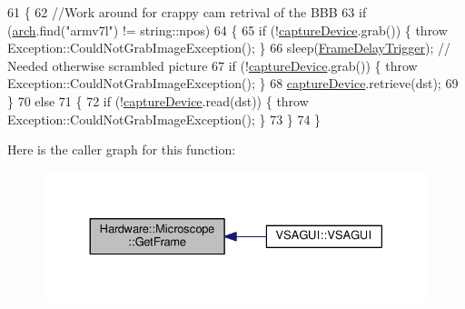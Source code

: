 \begin{DoxyCode}
61     \{
62         \textcolor{comment}{//Work around for crappy cam retrival of the BBB}
63         \textcolor{keywordflow}{if} (\hyperlink{class_hardware_1_1_microscope_a2e74ed11f3426a1a6adf05ec2d842066}{arch}.find(\textcolor{stringliteral}{"armv7l"}) != string::npos)
64         \{
65             \textcolor{keywordflow}{if} (!\hyperlink{class_hardware_1_1_microscope_a8fd921d7c937e808c5bc44c0294aa490}{captureDevice}.grab()) \{ \textcolor{keywordflow}{throw} Exception::CouldNotGrabImageException(); \}
66             sleep(\hyperlink{class_hardware_1_1_microscope_ac2da14781a22924a389fc287df3dbfda}{FrameDelayTrigger}); \textcolor{comment}{// Needed otherwise scrambled picture}
67             \textcolor{keywordflow}{if} (!\hyperlink{class_hardware_1_1_microscope_a8fd921d7c937e808c5bc44c0294aa490}{captureDevice}.grab()) \{ \textcolor{keywordflow}{throw} Exception::CouldNotGrabImageException(); \}
68             \hyperlink{class_hardware_1_1_microscope_a8fd921d7c937e808c5bc44c0294aa490}{captureDevice}.retrieve(dst);
69         \}
70         \textcolor{keywordflow}{else}
71         \{
72             \textcolor{keywordflow}{if} (!\hyperlink{class_hardware_1_1_microscope_a8fd921d7c937e808c5bc44c0294aa490}{captureDevice}.read(dst)) \{ \textcolor{keywordflow}{throw} Exception::CouldNotGrabImageException(); \}
73         \}
74     \}
\end{DoxyCode}


Here is the caller graph for this function\+:\nopagebreak
\begin{figure}[H]
\begin{center}
\leavevmode
\includegraphics[width=330pt]{class_hardware_1_1_microscope_a1ec5c792320ae4db3f3b39830e74f880_icgraph}
\end{center}
\end{figure}


\hypertarget{class_hardware_1_1_microscope_a8cec2eacbd3f0ea164d16100a6078d5b}{}
